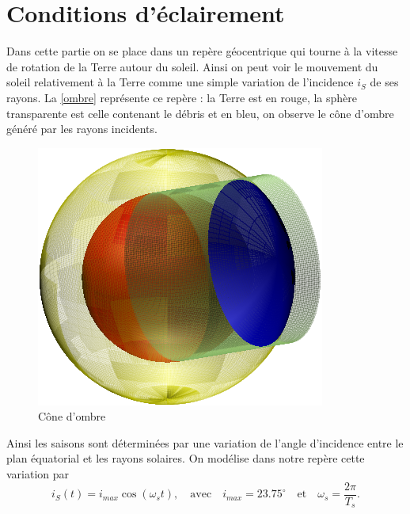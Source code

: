 \documentclass[a4paper,11pt]{article}
\numberwithin{section}{part}
\begin{document}










\section{Conditions d'\'eclairement}

Dans cette partie on se place dans un rep\`ere g\'eocentrique qui tourne \`a la vitesse de rotation de la Terre autour du soleil. Ainsi on peut voir le mouvement du soleil relativement \`a la Terre comme une simple variation de l'incidence $i_S$ de ses rayons.  La \autoref{ombre} repr\'esente ce rep\`ere : la Terre est en rouge, la sph\`ere transparente est celle contenant le d\'ebris et en bleu, on observe le c\^one d'ombre g\'en\'er\'e par les rayons incidents. 

 \begin{figure}[ht]
    \centering
    \includegraphics[width=.6\textwidth]{figures/ombre.pdf}
    \caption{C\^one d'ombre}\label{ombre}
 \end{figure}
 
Ainsi les saisons sont d\'etermin\'ees par une variation de l'angle d'incidence entre le plan \'equatorial et les rayons solaires.
On mod\'elise dans notre rep\`ere cette variation par 
\[ i_{S}(t)= i_{max}\cos(\omega_{s}t), \quad \text{avec} \quad i_{max}=23.75^\circ \quad \text{et}  \quad \omega_s=\frac{2\pi}{T_s}.\]
 
\end{document}
